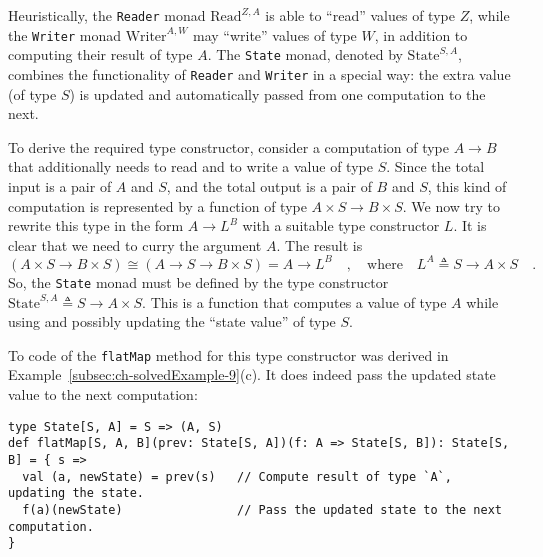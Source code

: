 Heuristically, the \lstinline!Reader! monad $\text{Read}^{Z,A}$
is able to \textsf{``}read\textsf{''} values of type $Z$, while the \lstinline!Writer!
monad $\text{Writer}^{A,W}$ may \textsf{``}write\textsf{''} values of type $W$,
in addition to computing their result of type $A$. The \lstinline!State!
monad, denoted by $\text{State}^{S,A}$, combines the functionality
of \lstinline!Reader! and \lstinline!Writer! in a special way: the
extra value (of type $S$) is updated and automatically passed from
one computation to the next. 

To derive the required type constructor, consider a computation of
type $A\rightarrow B$ that additionally needs to read and to write
a value of type $S$. Since the total input is a pair of $A$ and
$S$, and the total output is a pair of $B$ and $S$, this kind of
computation is represented by a function of type $A\times S\rightarrow B\times S$.
We now try to rewrite this type in the form $A\rightarrow L^{B}$
with a suitable type constructor $L$. It is clear that we need to
curry the argument $A$. The result is 
\[
\left(A\times S\rightarrow B\times S\right)\cong\left(A\rightarrow S\rightarrow B\times S\right)=A\rightarrow L^{B}\quad,\quad\text{where}\quad L^{A}\triangleq S\rightarrow A\times S\quad.
\]
So, the \lstinline!State!
monad must be defined by the type constructor $\text{State}^{S,A}\triangleq S\rightarrow A\times S$.
This is a function that computes a value of type $A$ while using
and possibly updating the \textsf{``}state value\textsf{''} of type $S$.

To code of the \lstinline!flatMap! method for this type constructor
was derived in Example~\ref{subsec:ch-solvedExample-9}(c). It does
indeed pass the updated state value to the next computation:
\begin{lstlisting}
type State[S, A] = S => (A, S)
def flatMap[S, A, B](prev: State[S, A])(f: A => State[S, B]): State[S, B] = { s =>
  val (a, newState) = prev(s)   // Compute result of type `A`, updating the state.
  f(a)(newState)                // Pass the updated state to the next computation.
}
\end{lstlisting}


